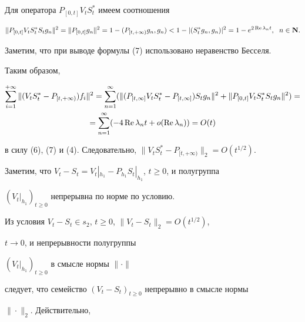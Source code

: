 Для оператора $P_{[0,t]}V_tS_t^*$ имеем соотношения


\begin{equation}


\|P_{[0,t]}V_tS_t^*S_tg_n\|^2=\|P_{[0,t]}g_n\|^2=1-(P_{[t,+\infty)}g_n,g_n)<


1-|(S_t^*g_n,g_n)|^2=1-e^{2\re\lambda_nt},\ \; n\in \bold N.


\end{equation}


Заметим, что при выводе формулы (7) использовано неравенство Бесселя.





Таким образом,


\begin{multline*}


\sum \limits_{i=1}^{+\infty}\|(V_tS_t^*-P_{[t,+\infty)})f_i\|^2=


\sum \limits_{n=1}^{\infty}(\|(P_{[t,\infty ]}V_tS_t^*-


P_{[t,\infty ]})S_tg_n\|^2+ \|P_{[0,t]}V_tS_t^*S_tg_n\|^2)= \\


%


=\sum\limits_{n=1}^{\infty}(-4\re\lambda_nt + o(\re\lambda_n))=O(t)


\end{multline*}


в силу (6), (7) и (4). Следовательно, $\|V_tS_t^*-P_{[t,+\infty)}\|_2=


O(t^{1/2})$.





Заметим, что $V_t-S_t=V_t|_{h_1}-P_{h_1}S_t|_{h_1}$, $t\geq 0$, и полугруппа


$(V_t|_{h_1})_{t\geq 0}$ непрерывна по норме по условию.


Из условия $V_t-S_t\in s_2$, $t\geq 0$, $\|V_t-S_t\|_2=O(t^{1/2})$,


$t\to 0$, и непрерывности полугруппы


$(V_t|_{h_1})_{t\geq 0}$ в смысле нормы $\|\cdot \|$


следует, что семейство $(V_t-S_t)_{t\geq 0}$ непрерывно в смысле нормы


$\|\cdot \|_2$. Действительно,


